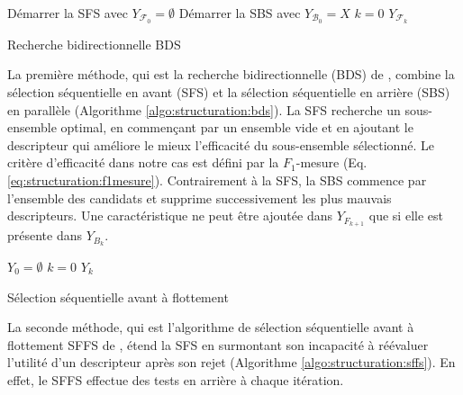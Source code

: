 \begin{algorithm}[ht] \small
	Démarrer la SFS avec $Y_{\mathcal{F}_0}= \emptyset $\; 
	Démarrer la SBS avec $Y_{\mathcal{B}_0}=X$\; $k=0$\;
	\Return $Y_{\mathcal{F}_k}$\;
	\caption{Recherche bidirectionnelle BDS} \label{algo:structuration:bds}
\end{algorithm}
La première méthode, qui est la recherche bidirectionnelle (BDS) de \citet{liu2012featureSelection}, combine la sélection séquentielle en avant (SFS) et la sélection séquentielle en arrière (SBS) en parallèle (Algorithme \ref{algo:structuration:bds}). 
La SFS recherche un sous-ensemble optimal, en commençant par un ensemble vide et en ajoutant le descripteur qui améliore le mieux l'efficacité du sous-ensemble sélectionné. Le critère d'efficacité dans notre cas est défini par la $F_1$-mesure (Eq. \ref{eq:structuration:f1mesure}). Contrairement à la SFS, la SBS commence par l'ensemble des candidats et supprime successivement les plus mauvais descripteurs. Une caractéristique ne peut être ajoutée dans $Y_{F_{k+1}}$ que si elle est présente dans $Y_{B_{k}}$.



\begin{algorithm}[ht] %
	$Y_0= \emptyset $\; 
	$k=0$\;
	\Return $Y_k$\;
	\caption{Sélection séquentielle avant à flottement}\label{algo:structuration:sffs}
\end{algorithm}

La seconde méthode, qui est l'algorithme de sélection séquentielle avant à flottement SFFS  de \citet{pudil1994floatingFeatSelection}, étend la SFS en surmontant son incapacité à réévaluer l'utilité d'un descripteur après son rejet (Algorithme \ref{algo:structuration:sffs}). En effet, le SFFS effectue des tests en arrière à chaque itération.

